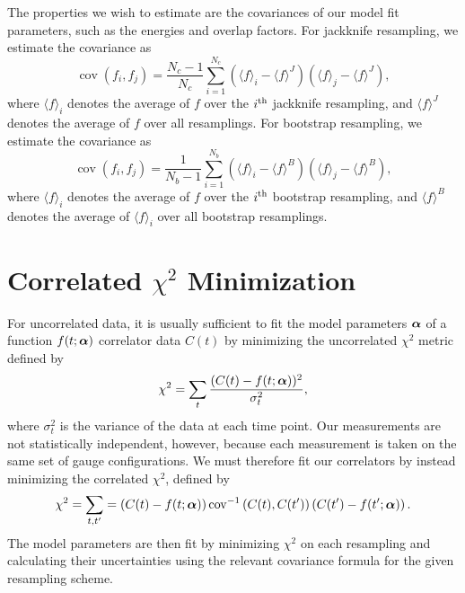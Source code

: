The properties we wish to estimate are the covariances of our model fit parameters, such as the energies and overlap factors. For jackknife resampling, we estimate the covariance as
\begin{equation}
    \operatorname{cov}(f_i, f_j) = \frac{N_c - 1}{N_c}\sum_{i=1}^{N_c}\left(\langle f \rangle_i - \langle f \rangle^J\right)\left(\langle f \rangle_j - \langle f \rangle^J\right),
\end{equation}
where $\langle f \rangle_i$ denotes the average of $f$ over the $i^{\rm{th}}$ jackknife resampling, and $\langle f \rangle^J$ denotes the average of $f$ over all resamplings. For bootstrap resampling, we estimate the covariance as
\begin{equation}
    \operatorname{cov}(f_i, f_j) = \frac{1}{N_b-1}\sum_{i=1}^{N_b}\left(\langle f \rangle_i - \langle f \rangle^B\right)\left(\langle f \rangle_j - \langle f \rangle^B\right),
\end{equation}
where $\langle f \rangle_i$ denotes the average of $f$ over the $i^{\rm{th}}$ bootstrap resampling, and $\langle f \rangle^B$ denotes the average of $\langle f \rangle_i$ over all bootstrap resamplings.
\section{Correlated $\chi^2$ Minimization}
For uncorrelated data, it is usually sufficient to fit the model parameters $\boldsymbol{\alpha}$ of a function $f(t;\boldsymbol{\alpha})$ correlator data $C(t)$ by minimizing the uncorrelated $\chi^2$ metric defined by
\begin{equation}
    \chi^{2}=\sum_{t} \frac{(C(t)-f(t;\boldsymbol{\alpha}))^{2}}{\sigma_{t}^{2}},
\end{equation}
where $\sigma_t^2$ is the variance of the data at each time point. Our measurements are not statistically independent, however, because each measurement is taken on the same set of gauge configurations. We must therefore fit our correlators by instead minimizing the correlated $\chi^2$, defined by
\begin{equation}\label{eq:corr_chisq}
    \chi^{2}= \sum_{t,t^\prime} = \left(C(t) - f(t;\boldsymbol{\alpha})\right)\operatorname{cov}^{-1}\left(C(t), C(t^\prime)\right)\left(C(t^\prime) - f(t^\prime; \boldsymbol{\alpha})\right).
\end{equation}
The model parameters are then fit by minimizing $\chi^2$ on each resampling and calculating their uncertainties using the relevant covariance formula for the given resampling scheme.